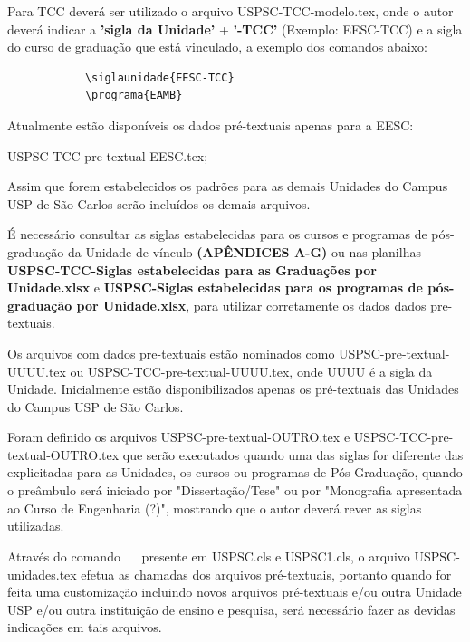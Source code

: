 Para TCC deverá ser utilizado o arquivo USPSC-TCC-modelo.tex, onde o autor deverá indicar a \textbf{'sigla da Unidade'} + \textbf{'-TCC'} (Exemplo: EESC-TCC) e a sigla do curso de graduação que está vinculado, a exemplo dos comandos abaixo:
			
			\begin{verbatim}
			\siglaunidade{EESC-TCC}
			\programa{EAMB}
			\end{verbatim}
			
Atualmente estão disponíveis os dados pré-textuais apenas para a EESC:
			
			\begin{alineas}	 
				\item USPSC-TCC-pre-textual-EESC.tex;
			\end{alineas}
			
Assim que forem estabelecidos os padrões para as demais Unidades do Campus USP de São Carlos serão incluídos os demais arquivos.
			
			
É necessário consultar as siglas estabelecidas para os cursos e programas de pós-graduação da Unidade de vínculo \textbf{(APÊNDICES A-G)} ou nas planilhas \textbf{USPSC-TCC-Siglas estabelecidas para as Graduações por Unidade.xlsx} e \textbf{USPSC-Siglas estabelecidas para os programas de pós-graduação por Unidade.xlsx}, para utilizar corretamente os dados dados pre-textuais. 

Os arquivos com dados pre-textuais estão nominados como USPSC-pre-textual-UUUU.tex ou USPSC-TCC-pre-textual-UUUU.tex, onde UUUU é a sigla da Unidade. Inicialmente estão disponibilizados apenas os pré-textuais das Unidades do Campus USP de São Carlos.
			
Foram definido os arquivos USPSC-pre-textual-OUTRO.tex e USPSC-TCC-pre-textual-OUTRO.tex que serão executados quando uma das siglas for diferente das explicitadas para as Unidades, os cursos ou programas de Pós-Graduação, quando o preâmbulo será iniciado por "Dissertação/Tese"   ou por "Monografia apresentada ao Curso de Engenharia (?)", mostrando que o autor deverá rever as siglas utilizadas.

Através do comando \verb+  + presente em USPSC.cls e USPSC1.cls,  o arquivo USPSC-unidades.tex efetua as chamadas dos arquivos pré-textuais, portanto quando for feita uma customização incluindo novos arquivos pré-textuais e/ou outra Unidade USP e/ou outra instituição de ensino e pesquisa, será necessário fazer as devidas indicações em tais arquivos. 
	 
